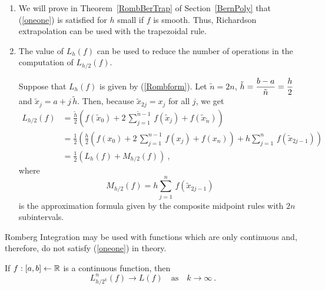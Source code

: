 \begin{rmkList}
\begin{enumerate}
\item We will prove in Theorem~\ref{RombBerTrap} of
Section~\ref{BernPoly} that (\ref{oneone}) is satisfied
for $h$ small if $f$ is smooth.   Thus, Richardson extrapolation can
be used with the trapezoidal rule.
\item The value of $L_h(f)$ can be used to reduce the number of
operations in the computation of $L_{h/2}(f)$.

Suppose that $L_h(f)$ is given by (\ref{Rombform}).  Let
$\tilde{n} = 2n$,
$\displaystyle \tilde{h} = \frac{b-a}{\tilde{n}} = \frac{h}{2}$ and
$\tilde{x}_j = a + j\,\tilde{h}$.  Then, because
$\tilde{x}_{2j} = x_j$ for all $j$, we get
\begin{align*}
L_{h/2}(f) &= \frac{\tilde{h}}{2} \left( f(\tilde{x}_0) +
 2\,\sum_{j=1}^{\tilde{n}-1}\,f(\tilde{x}_j) +
 f(\tilde{x}_{\tilde{n}}) \right) \\
&= \frac{1}{2} \left(\frac{h}{2} \left( f(x_0) +
 2\,\sum_{j=1}^{n-1}\,f(x_j) + f(x_n)\right) +
 h\sum_{j=1}^{n}\,f(\tilde{x}_{2j-1}) \right) \\
&= \frac{1}{2} \left(L_h(f) + M_{h/2}(f) \right) \ ,
\end{align*}
where
\[
M_{h/2}(f) = h\sum_{j=1}^{n}\,f(\tilde{x}_{2j-1})
\]
is the approximation formula given by the composite midpoint rules with
$2n$ subintervals.
\end{enumerate}
\end{rmkList}

Romberg Integration may be used with functions which are only
continuous and, therefore, do not satisfy (\ref{oneone}) in theory.

\begin{theorem}
If $f:[a,b]\leftarrow \mathbb{R}$ is a continuous function, then
\begin{equation}\label{convRich}
L_{h/2^k}^n(f) \rightarrow L(f) \quad \text{as} \quad
k \rightarrow \infty \ .
\end{equation}
\end{theorem}

